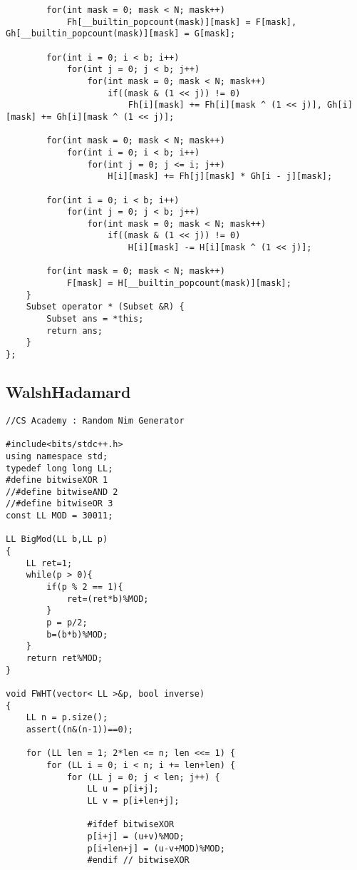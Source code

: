\documentclass[FSZ,a4paper,onesided]{article}
\begin{document}
\begin{multicols*}{\COLS}
\begin{lstlisting}
        for(int mask = 0; mask < N; mask++) 
            Fh[__builtin_popcount(mask)][mask] = F[mask], Gh[__builtin_popcount(mask)][mask] = G[mask];

        for(int i = 0; i < b; i++)
            for(int j = 0; j < b; j++)
                for(int mask = 0; mask < N; mask++)
                    if((mask & (1 << j)) != 0)
                        Fh[i][mask] += Fh[i][mask ^ (1 << j)], Gh[i][mask] += Gh[i][mask ^ (1 << j)];
                    
        for(int mask = 0; mask < N; mask++)
            for(int i = 0; i < b; i++)
                for(int j = 0; j <= i; j++)
                    H[i][mask] += Fh[j][mask] * Gh[i - j][mask];

        for(int i = 0; i < b; i++) 
            for(int j = 0; j < b; j++) 
                for(int mask = 0; mask < N; mask++) 
                    if((mask & (1 << j)) != 0) 
                        H[i][mask] -= H[i][mask ^ (1 << j)];
                
        for(int mask = 0; mask < N; mask++)  
            F[mask] = H[__builtin_popcount(mask)][mask];
    }
    Subset operator * (Subset &R) {
        Subset ans = *this;
        return ans;
    }
};
\end{lstlisting}
\subsection{WalshHadamard}
\begin{lstlisting}
//CS Academy : Random Nim Generator

#include<bits/stdc++.h>
using namespace std;
typedef long long LL;
#define bitwiseXOR 1
//#define bitwiseAND 2
//#define bitwiseOR 3
const LL MOD = 30011;

LL BigMod(LL b,LL p)
{
    LL ret=1;
    while(p > 0){
        if(p % 2 == 1){
            ret=(ret*b)%MOD;
        }
        p = p/2;
        b=(b*b)%MOD;
    }
    return ret%MOD;
}

void FWHT(vector< LL >&p, bool inverse)
{
    LL n = p.size();
    assert((n&(n-1))==0);

    for (LL len = 1; 2*len <= n; len <<= 1) {
        for (LL i = 0; i < n; i += len+len) {
            for (LL j = 0; j < len; j++) {
                LL u = p[i+j];
                LL v = p[i+len+j];

                #ifdef bitwiseXOR
                p[i+j] = (u+v)%MOD;
                p[i+len+j] = (u-v+MOD)%MOD;
                #endif // bitwiseXOR


\end{lstlisting}
\end{multicols*}
\end{document}
